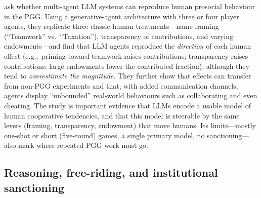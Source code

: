 \documentclass[11pt,a4paper]{article}
\newcommand{\eg}{e.g.,\ }
\begin{document}
\citet{sreedhar2025simulating} ask whether multi-agent LLM systems can reproduce
human prosocial behaviour in the PGG. Using a generative-agent architecture with
three or four player agents, they replicate three classic human treatments---name
framing (``Teamwork'' vs.\ ``Taxation''), transparency of contributions, and
varying endowments---and find that LLM agents reproduce the \emph{direction} of
each human effect (\eg priming toward teamwork raises contributions; transparency
raises contributions; large endowments lower the contributed fraction), although
they tend to \emph{overestimate the magnitude}. They further show that effects can
transfer from non-PGG experiments and that, with added communication channels,
agents display ``unbounded'' real-world behaviours such as collaborating and even
cheating. The study is important evidence that LLMs encode a usable model of human
cooperative tendencies, and that this model is steerable by the same levers
(framing, transparency, endowment) that move humans. Its limits---mostly one-shot
or short (five-round) games, a single primary model, no sanctioning---also mark
where repeated-PGG work must go.

\subsection{Reasoning, free-riding, and institutional sanctioning}
\end{document}
